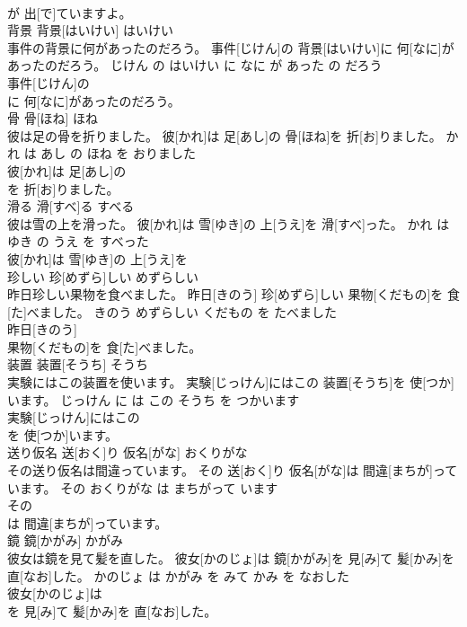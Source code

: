 \documentclass[8pt]{extreport}
\begin{document}
\begin{CJK}{UTF8}{min}
\\	が 出[で]ていますよ。			
\\	背景	背景[はいけい]	はいけい	
\\	事件の背景に何があったのだろう。	事件[じけん]の 背景[はいけい]に 何[なに]があったのだろう。	じけん の はいけい に なに が あった の だろう	
\\	事件[じけん]の
\\	に 何[なに]があったのだろう。			
\\	骨	骨[ほね]	ほね	
\\	彼は足の骨を折りました。	彼[かれ]は 足[あし]の 骨[ほね]を 折[お]りました。	かれ は あし の ほね を おりました	
\\	彼[かれ]は 足[あし]の
\\	を 折[お]りました。			
\\	滑る	滑[すべ]る	すべる	
\\	彼は雪の上を滑った。	彼[かれ]は 雪[ゆき]の 上[うえ]を 滑[すべ]った。	かれ は ゆき の うえ を すべった	
\\	彼[かれ]は 雪[ゆき]の 上[うえ]を
\\	珍しい	珍[めずら]しい	めずらしい	
\\	昨日珍しい果物を食べました。	昨日[きのう] 珍[めずら]しい 果物[くだもの]を 食[た]べました。	きのう めずらしい くだもの を たべました	
\\	昨日[きのう]
\\	果物[くだもの]を 食[た]べました。			
\\	装置	装置[そうち]	そうち	
\\	実験にはこの装置を使います。	実験[じっけん]にはこの 装置[そうち]を 使[つか]います。	じっけん に は この そうち を つかいます	
\\	実験[じっけん]にはこの
\\	を 使[つか]います。			
\\	送り仮名	送[おく]り 仮名[がな]	おくりがな	
\\	その送り仮名は間違っています。	その 送[おく]り 仮名[がな]は 間違[まちが]っています。	その おくりがな は まちがって います	
\\	その
\\	は 間違[まちが]っています。			
\\	鏡	鏡[かがみ]	かがみ	
\\	彼女は鏡を見て髪を直した。	彼女[かのじょ]は 鏡[かがみ]を 見[み]て 髪[かみ]を 直[なお]した。	かのじょ は かがみ を みて かみ を なおした	
\\	彼女[かのじょ]は
\\	を 見[み]て 髪[かみ]を 直[なお]した。			

\end{CJK}
\end{document}

